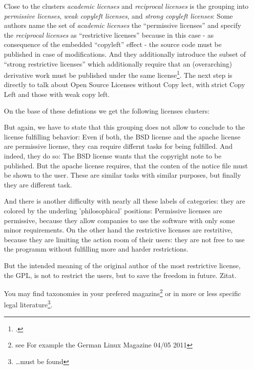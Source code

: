 Close to the clusters \emph{academic licenses} and \emph{reciprocal licenses} is
the grouping into \emph{permissive licenses}, \emph{weak copyleft licenses}, and
\emph{strong copyleft licenses}: Some authors name the set of \emph{academic
licenses} the \enquote{permissive licenses} and specify the \emph{reciprocal
licenses} as \enquote{restrictive licenses} because in this case - as
consequence of the embedded \enquote{copyleft} effect - the source code must be
published in case of modifications. And they additionally introduce the subset
of \enquote{strong restrictive licenses} which additionally require that an
(overarching) derivative work must be published under the same
license\footcite[cf.][57]{Buchtala2007a}. The next step is directly to talk
about Open Source Licenses without Copy lect, with strict Copy Left and those
with weak copy left.

On the base of these defintions we get the following licenses clusters:

But again, we have to state that this grouping does not allow to conclude to the
license fulfilling behavior: Even if both, the BSD license and the apache
license are permissive license, they can require differnt tasks for being
fulfilled. And indeed, they do so: The BSD license wants that the copyright note
to be published. But the apache license requires, that the conten of the notice
file must be shown to the user. These are similar tasks with similar purposes,
but finally they are different task.

And there is another difficulty with nearly all these labels of categories: they
are colored by the underling 'philosophical' positions: Permissive licenses are
permissive, because they allow companies to use the software with only some
minor requirements. On the other hand the restrictive licenses are restritive,
because they are limiting the action room of their users: they are not free to
use the programm without fulfilling more and harder restrictions.

But the intended meaning of the original author of the most restrictive license,
the GPL, is not to restrict the users, but to save the freedom in future. Zitat.




You may find taxonomies in your prefered magazins\footnote{see For example the
German Linux Magazine 04/05 2011
} or in more or less specific legal literature\footnote{\ldots must be found
}.

